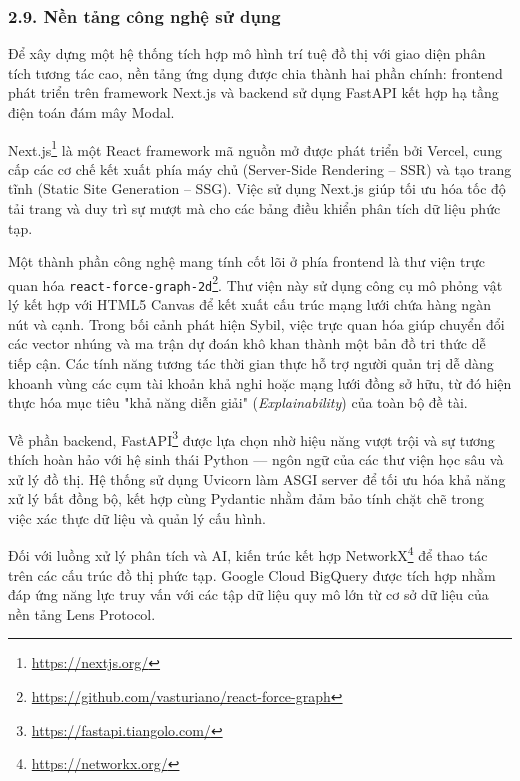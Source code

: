 \subsubsection{2.9. Nền tảng công nghệ sử dụng}

\indent\indent Để xây dựng một hệ thống tích hợp mô hình trí tuệ đồ thị với giao diện phân tích tương tác cao, nền tảng ứng dụng được chia thành hai phần chính: frontend phát triển trên framework Next.js và backend sử dụng FastAPI kết hợp hạ tầng điện toán đám mây Modal.\vspace{0.3cm}

Next.js\footnote{\url{https://nextjs.org/}} là một React framework mã nguồn mở được phát triển bởi Vercel, cung cấp các cơ chế kết xuất phía máy chủ (Server-Side Rendering -- SSR) và tạo trang tĩnh (Static Site Generation -- SSG). Việc sử dụng Next.js giúp tối ưu hóa tốc độ tải trang và duy trì sự mượt mà cho các bảng điều khiển phân tích dữ liệu phức tạp.\vspace{0.3cm}

Một thành phần công nghệ mang tính cốt lõi ở phía frontend là thư viện trực quan hóa \texttt{react-force-graph-2d}\footnote{\url{https://github.com/vasturiano/react-force-graph}}. Thư viện này sử dụng công cụ mô phỏng vật lý kết hợp với HTML5 Canvas để kết xuất cấu trúc mạng lưới chứa hàng ngàn nút và cạnh. Trong bối cảnh phát hiện Sybil, việc trực quan hóa giúp chuyển đổi các vector nhúng và ma trận dự đoán khô khan thành một bản đồ tri thức dễ tiếp cận. Các tính năng tương tác thời gian thực hỗ trợ người quản trị dễ dàng khoanh vùng các cụm tài khoản khả nghi hoặc mạng lưới đồng sở hữu, từ đó hiện thực hóa mục tiêu "khả năng diễn giải" (\textit{Explainability}) của toàn bộ đề tài.\vspace{0.3cm}

Về phần backend, FastAPI\footnote{\url{https://fastapi.tiangolo.com/}} được lựa chọn nhờ hiệu năng vượt trội và sự tương thích hoàn hảo với hệ sinh thái Python — ngôn ngữ của các thư viện học sâu và xử lý đồ thị. Hệ thống sử dụng Uvicorn làm ASGI server để tối ưu hóa khả năng xử lý bất đồng bộ, kết hợp cùng Pydantic nhằm đảm bảo tính chặt chẽ trong việc xác thực dữ liệu và quản lý cấu hình.\vspace{0.3cm}

Đối với luồng xử lý phân tích và AI, kiến trúc kết hợp NetworkX\footnote{\url{https://networkx.org/}} để thao tác trên các cấu trúc đồ thị phức tạp. Google Cloud BigQuery được tích hợp nhằm đáp ứng năng lực truy vấn với các tập dữ liệu quy mô lớn từ cơ sở dữ liệu của nền tảng Lens Protocol.\vspace{0.3cm}

